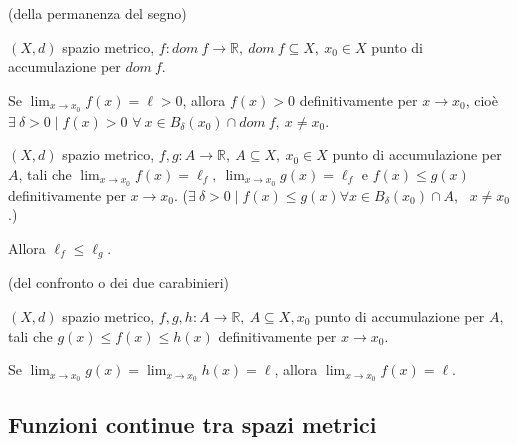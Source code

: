 \begin{theorem} (della permanenza del segno)
	
	$(X,d)$ spazio metrico, $f: dom \ f \rightarrow \mathbb{R}, \ dom \ f \subseteq X, \ x_0 \in X$ punto di accumulazione per $dom \ f$.
	
	Se $\lim_{x \rightarrow x_0} f(x) = \ell > 0$, allora $f(x) > 0$ definitivamente per $ x \rightarrow x_0$, cioè $\exists \ \delta > 0 \; \big| \; f(x) > 0$ $\forall \ x \in B_\delta (x_0) \cap dom \ f, \ x \neq x_0$. 
\end{theorem}


\begin{theorem}
	$(X,d)$ spazio metrico, $f,g: A \rightarrow \mathbb{R}, \ A \subseteq X, \ x_0 \in X$ punto di accumulazione per $A$, tali che $\lim_{x \rightarrow x_0} f(x) = \ell_f, \ \lim_{x \rightarrow x_0} g(x) = \ell_f$ e $f(x) \leq g(x)$ definitivamente per $x \rightarrow x_0$. ($\exists \ \delta > 0 \; \big| \; f(x) \leq g(x) \forall x \in B_\delta (x_0) \cap A$, \ $x \neq x_0$.)
	
	Allora $\ell_f \leq \ell_g$.
\end{theorem}


\begin{theorem}(del confronto o dei due carabinieri)
	
	$(X,d)$ spazio metrico, $f,g,h : A \rightarrow \mathbb{R}, \ A \subseteq X, x_0$ punto di accumulazione per $A$, tali che $g(x) \leq f(x) \leq h(x)$ definitivamente per $x \rightarrow x_0$. 
	
	Se $\lim_{x \rightarrow x_0} g(x) = \lim_{x \rightarrow x_0} h(x) = \ell$, allora $\lim_{x \rightarrow x_0} f(x) = \ell$.
\end{theorem}


\subsection{Funzioni continue tra spazi metrici}


